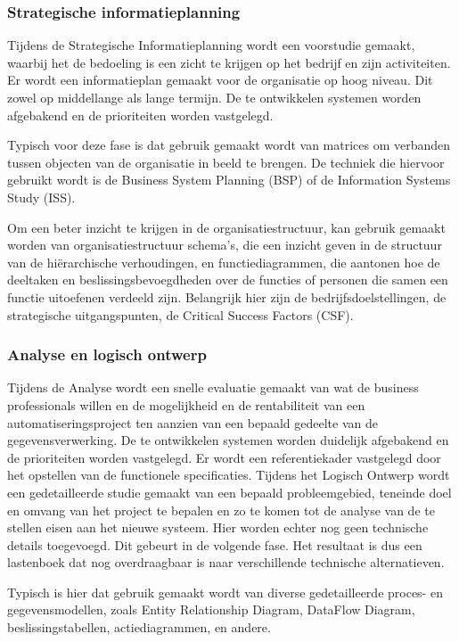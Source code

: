 \subsubsection{Strategische informatieplanning}

Tijdens de Strategische Informatieplanning wordt een voorstudie gemaakt, waarbij het de bedoeling is een zicht te krijgen op het bedrijf en zijn activiteiten. Er wordt een informatieplan gemaakt voor de organisatie op hoog niveau. Dit zowel op middellange als lange termijn. De te ontwikkelen systemen worden afgebakend en de prioriteiten worden vastgelegd.

Typisch voor deze fase is dat gebruik gemaakt wordt van matrices om verbanden tussen objecten van de organisatie in beeld te brengen. De techniek die hiervoor gebruikt wordt is de Business System Planning (BSP) of de Information Systems Study (ISS).

Om een beter inzicht te krijgen in de organisatiestructuur, kan gebruik gemaakt worden van organisatiestructuur schema's, die een inzicht geven in de structuur van de hiërarchische verhoudingen, en functiediagrammen, die aantonen hoe de deeltaken en beslissingsbevoegdheden over de functies of personen die samen een functie uitoefenen verdeeld zijn. Belangrijk hier zijn de bedrijfsdoelstellingen, de strategische uitgangspunten, de Critical Success Factors (CSF).

\subsubsection{Analyse en logisch ontwerp}

Tijdens de Analyse wordt een snelle evaluatie gemaakt van wat de business professionals willen en de mogelijkheid en de rentabiliteit van een automatiseringsproject ten aanzien van een bepaald gedeelte van de gegevensverwerking. De te ontwikkelen systemen worden duidelijk afgebakend en de prioriteiten worden vastgelegd. Er wordt een referentiekader vastgelegd door het opstellen van de functionele specificaties.
Tijdens het Logisch Ontwerp wordt een gedetailleerde studie gemaakt van een bepaald probleemgebied, teneinde doel en omvang van het project te bepalen en zo te komen tot de analyse van de te stellen eisen aan het nieuwe systeem. Hier worden echter nog geen technische details toegevoegd. Dit gebeurt in de volgende fase. Het resultaat is dus een lastenboek dat nog overdraagbaar is naar verschillende technische alternatieven.

Typisch is hier dat gebruik gemaakt wordt van diverse gedetailleerde proces- en gegevensmodellen, zoals Entity Relationship Diagram, DataFlow Diagram, beslissingstabellen, actiediagrammen, en andere.

